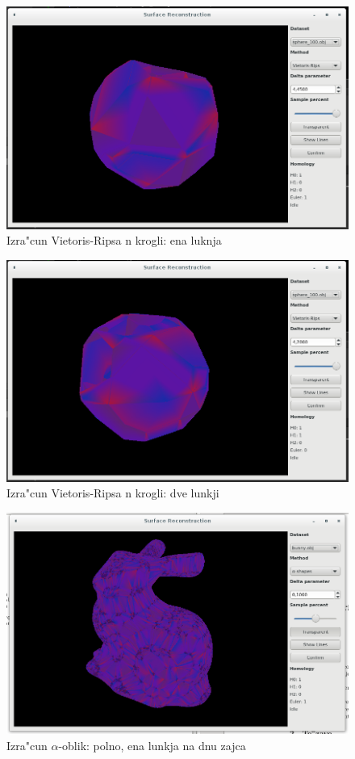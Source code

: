 \documentclass[11pt]{article}
\begin{document}
\begin{figure}[htb]
    \centering
    \includegraphics[width=1\textwidth]{vr_1hole.png}
    \caption{Izra"cun Vietoris-Ripsa n krogli: ena luknja}
    \label{fig:vr3}
\end{figure}

\begin{figure}[htb]
    \centering
    \includegraphics[width=1\textwidth]{vr_2hole.png}
    \caption{Izra"cun Vietoris-Ripsa n krogli: dve lunkji}
    \label{fig:vr4}
\end{figure}

\begin{figure}[htb]
    \centering
    \includegraphics[width=1\textwidth]{alpha_full.png}
    \caption{Izra"cun $\alpha$-oblik: polno, ena lunkja na dnu zajca}
    \label{fig:a1}
\end{figure}
\end{document}
